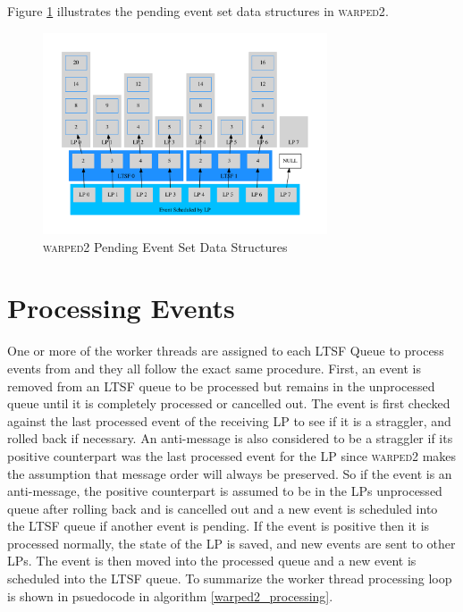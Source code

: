 \documentclass[11pt]{book}
\begin{document}
Figure \ref{pending_event_set} illustrates the pending event set data structures in
\textsc{warped2}.

\begin{figure}[H]
    \centering
    \includegraphics[width=0.75\textwidth,quiet]{figs/graphviz/pending_event_set.pdf}
    \caption{\textsc{warped2} Pending Event Set Data Structures}\label{pending_event_set}
\end{figure}

\section{Processing Events}

One or more of the worker threads are assigned to each LTSF Queue to process events from
and they all follow the exact same procedure. First, an event is removed from an LTSF
queue to be processed but remains in the unprocessed queue until it is completely processed or
cancelled out. The event is first checked against the last processed event of the receiving LP
to see if it is a straggler, and rolled back if necessary. An anti-message is also considered to
be a straggler if its positive counterpart was the last processed event for the LP since
\textsc{warped2} makes the assumption that message order will always be preserved.
So if the event is an anti-message, the positive counterpart is assumed to be in the LPs
unprocessed queue after rolling back and is cancelled out and a new event is scheduled into the
LTSF queue if another event is pending. If the event is positive then it is processed normally,
the state of the LP is saved, and new events are sent to other LPs. The event is then moved
into the processed queue and a new event is scheduled into the LTSF queue. To summarize the
worker thread processing loop is shown in psuedocode in algorithm \ref{warped2_processing}.
\end{document}
